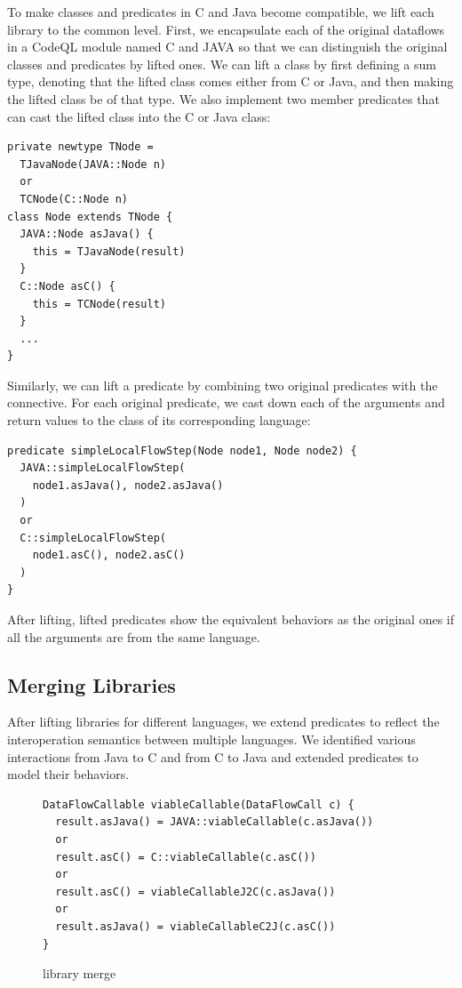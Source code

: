 To make classes and predicates in C and Java become compatible,
we lift each library to the common level.
First, we encapsulate each of the original dataflows in a CodeQL
module named C and JAVA so that we can distinguish the original
classes and predicates by lifted ones.
We can lift a class by first defining a sum type, denoting that
the lifted class comes either from C or Java, and then making the
lifted class be of that type.  We also implement two member predicates
that can cast the lifted class into the C or Java class:
\begin{lstlisting}[style=codeql,xleftmargin=2.5em]
private newtype TNode =
  TJavaNode(JAVA::Node n)
  or
  TCNode(C::Node n)
class Node extends TNode {
  JAVA::Node asJava() {
    this = TJavaNode(result)
  }
  C::Node asC() {
    this = TCNode(result)
  }
  ...
}
\end{lstlisting}
Similarly, we can lift a predicate by combining two original predicates with
the  connective. For each original predicate, we cast down
each of the arguments and return values to the class of its corresponding language:
\begin{lstlisting}[style=codeql,xleftmargin=2.5em]
predicate simpleLocalFlowStep(Node node1, Node node2) {
  JAVA::simpleLocalFlowStep(
    node1.asJava(), node2.asJava()
  )
  or
  C::simpleLocalFlowStep(
    node1.asC(), node2.asC()
  )
}
\end{lstlisting}
After lifting, lifted predicates show the equivalent behaviors as the
original ones if all the arguments are from the same language.



\subsection{Merging Libraries}\label{sec:merging}
After lifting libraries for different languages, we extend predicates to
reflect the interoperation semantics between multiple languages.
We identified various interactions from Java to C and from C to Java
and extended predicates to model their behaviors.

\begin{figure}[t]
\begin{lstlisting}[style=codeql,xleftmargin=2.5em]
DataFlowCallable viableCallable(DataFlowCall c) {
  result.asJava() = JAVA::viableCallable(c.asJava())
  or
  result.asC() = C::viableCallable(c.asC())
  or
  result.asC() = viableCallableJ2C(c.asJava())
  or
  result.asJava() = viableCallableC2J(c.asC())
}
\end{lstlisting}
\caption{library merge}\label{fig:merge}
\end{figure}

